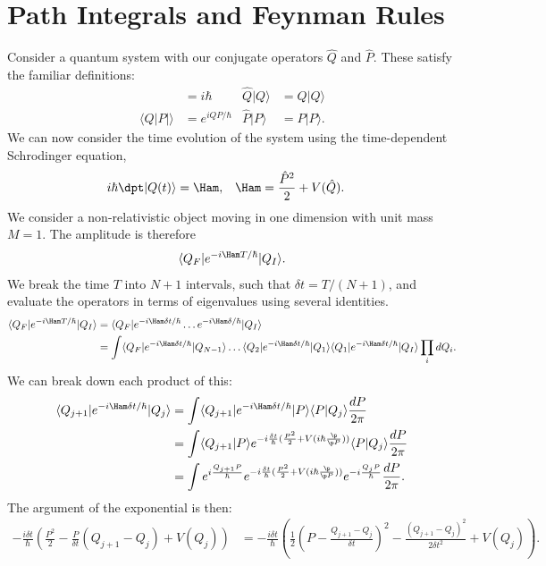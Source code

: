 \documentclass[a4paper, 11pt, normalem]{report}
\begin{document}
\chapter{Path Integrals and Feynman Rules}
Consider a quantum system with our conjugate operators $\hat{Q}$ and $\hat{P}$.
These satisfy the familiar definitions:
\begin{align}
    [\hat{Q},\hat{P}] &= i\hbar & \hat{Q}|Q\rangle &= Q|Q\rangle \\
    \langle Q|P|\rangle &= e^{iQP/\hbar} & \hat{P}|P\rangle &= P|P\rangle.
\end{align}
We can now consider the time evolution of the system using the time-dependent Schrodinger equation,
\begin{align}
    i\hbar\dpt|Q(t)\rangle &= \Ham, & \Ham &= \frac{\hat{P}^2}{2} + V(\hat{Q}).
\end{align}
We consider a non-relativistic object moving in one dimension with unit mass $M=1$.
The amplitude is therefore
\begin{align}
    \langle Q_F|e^{-i\Ham T/\hbar}|Q_I\rangle.
\end{align}
We break the time $T$ into $N+1$ intervals, such that $\delta t = T/(N+1)$, and evaluate the operators in terms of eigenvalues using several identities.
\begin{align}
    \langle Q_F|e^{-i\Ham T/\hbar}|Q_I\rangle &= \langle Q_F|e^{-i\Ham \delta t/\hbar}\dots e^{-i\Ham \delta/\hbar}|Q_I\rangle \\
                                              &= \int \langle Q_F|e^{-i\Ham \delta t/\hbar}|Q_{N-1}\rangle\dots\langle Q_2|e^{-i\Ham\delta t/\hbar}|Q_1\rangle\langle Q_1|e^{-i\Ham\delta t/\hbar}|Q_I\rangle\prod_i dQ_i.
\end{align}
We can break down each product of this:
\begin{align}
    \langle Q_{j+1}|e^{-i\Ham\delta t/\hbar}|Q_j\rangle &= \int \langle Q_{j+1}|e^{-i\Ham\delta t/\hbar}|P\rangle\langle P|Q_j\rangle\frac{dP}{2\pi} \\
                                                        &= \int \langle Q_{j+1}|P\rangle e^{-i\frac{\delta t}{\hbar}(\frac{P^2}{2}+V(i\hbar\frac{\p}{\p P}))}\langle P|Q_j\rangle\frac{dP}{2\pi} \\
    &= \int e^{i\frac{Q_{j+1}P}{\hbar}}e^{-i\frac{\delta t}{\hbar}(\frac{P^2}{2}+V(i\hbar\frac{\p}{\p P}))}e^{-i\frac{Q_jP}{\hbar}}\frac{dP}{2\pi}.
\end{align}
The argument of the exponential is then:
\begin{align}
    -\frac{i\delta t}{\hbar}\left(\frac{P^2}{2}-\frac{P}{\delta t}(Q_{j+1}-Q_j)+V(Q_j)\right) &= -\frac{i\delta t}{\hbar}\left(\frac12\left(P - \frac{Q_{j+1}-Q_j}{\delta t}\right)^2 - \frac{(Q_{j+1}-Q_j)^2}{2\delta t^2} + V(Q_j)\right).
\end{align}
\end{document}
